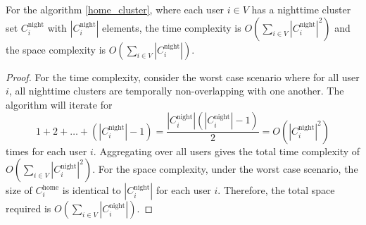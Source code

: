 
\label{complexity_analysis}

\begin{theorem}
For the algorithm \ref{home_cluster}, where each user $i \in V$ has a nighttime cluster set $C^{\text{night}}_i$ with $|C^{\text{night}}_i|$ elements, the time complexity is $O\left(\sum_{i \in V} |C^{\text{night}}_i|^2\right)$ and the space complexity is $O\left(\sum_{i \in V} |C^{\text{night}}_i|\right)$.
\end{theorem}

\begin{proof}
For the time complexity, consider the worst case scenario where for all user $i$, all nighttime clusters are temporally non-overlapping with one another. The algorithm will iterate for
$$
1+2+\ldots+(|C^{\text{night}}_i|-1) = \frac{|C^{\text{night}}_i|(|C^{\text{night}}_i|-1)}{2} = O(|C^{\text{night}}_i|^2)
$$
times for each user $i$. Aggregating over all users gives the total time complexity of $O\left(\sum_{i \in V} |C^{\text{night}}_i|^2\right)$.
For the space complexity, under the worst case scenario, the size of $C^{\text{home}}_i$ is identical to $|C^{\text{night}}_i|$ for each user $i$. Therefore, the total space required is $O\left(\sum_{i \in V} |C^{\text{night}}_i|\right)$.
\end{proof}

